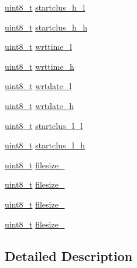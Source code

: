 \begin{DoxyCompactItemize}
\item 
\hyperlink{stdint_8h_aba7bc1797add20fe3efdf37ced1182c5}{uint8\-\_\-t} \hyperlink{struct__tag_d_i_r_e_n_t_abbc5040aff62aa0032cc4fe49f359574}{startclus\-\_\-h\-\_\-l}
\item 
\hyperlink{stdint_8h_aba7bc1797add20fe3efdf37ced1182c5}{uint8\-\_\-t} \hyperlink{struct__tag_d_i_r_e_n_t_a57c772209e69cb350d92a7d51255adb8}{startclus\-\_\-h\-\_\-h}
\item 
\hyperlink{stdint_8h_aba7bc1797add20fe3efdf37ced1182c5}{uint8\-\_\-t} \hyperlink{struct__tag_d_i_r_e_n_t_a55e29865ff62a0f7820636ccfd525ab9}{wrttime\-\_\-l}
\item 
\hyperlink{stdint_8h_aba7bc1797add20fe3efdf37ced1182c5}{uint8\-\_\-t} \hyperlink{struct__tag_d_i_r_e_n_t_a0070e26a98c091bf05cac0169864c40b}{wrttime\-\_\-h}
\item 
\hyperlink{stdint_8h_aba7bc1797add20fe3efdf37ced1182c5}{uint8\-\_\-t} \hyperlink{struct__tag_d_i_r_e_n_t_a16b08ba749d7e033f20391fc2ec1dce3}{wrtdate\-\_\-l}
\item 
\hyperlink{stdint_8h_aba7bc1797add20fe3efdf37ced1182c5}{uint8\-\_\-t} \hyperlink{struct__tag_d_i_r_e_n_t_a6505d3fa444487411c4e147077d80d19}{wrtdate\-\_\-h}
\item 
\hyperlink{stdint_8h_aba7bc1797add20fe3efdf37ced1182c5}{uint8\-\_\-t} \hyperlink{struct__tag_d_i_r_e_n_t_a0bbcf61e62f3be4056b1858f79b1a829}{startclus\-\_\-l\-\_\-l}
\item 
\hyperlink{stdint_8h_aba7bc1797add20fe3efdf37ced1182c5}{uint8\-\_\-t} \hyperlink{struct__tag_d_i_r_e_n_t_aeead86b0dc416f9ac91134f464a90775}{startclus\-\_\-l\-\_\-h}
\item 
\hyperlink{stdint_8h_aba7bc1797add20fe3efdf37ced1182c5}{uint8\-\_\-t} \hyperlink{struct__tag_d_i_r_e_n_t_a858550edbfeff5f97080c1447152d07d}{filesize\-\_}
\item 
\hyperlink{stdint_8h_aba7bc1797add20fe3efdf37ced1182c5}{uint8\-\_\-t} \hyperlink{struct__tag_d_i_r_e_n_t_a359b91c3884d2c0834e643533ef222f6}{filesize\-\_}
\item 
\hyperlink{stdint_8h_aba7bc1797add20fe3efdf37ced1182c5}{uint8\-\_\-t} \hyperlink{struct__tag_d_i_r_e_n_t_a736d6384e9ea1633b86d16d6cab12e5d}{filesize\-\_}
\item 
\hyperlink{stdint_8h_aba7bc1797add20fe3efdf37ced1182c5}{uint8\-\_\-t} \hyperlink{struct__tag_d_i_r_e_n_t_ad9ff06aac4eeca183d32f53fb2a776a8}{filesize\-\_}
\end{DoxyCompactItemize}


\subsection{Detailed Description}


